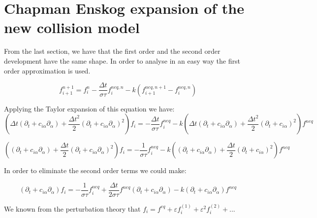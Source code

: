 \documentclass{article}
\begin{document}
\section{Chapman Enskog expansion of the new collision model}
From the last section, we have that the first order and the second order development have the same shape. In order to analyse in an easy way the first order approximation is
used.

\begin{equation}
    f_{i+1}^{n+1} =f_{i}^{n} -\frac{\Delta t}{\sigma\tau } f_{i}^{neq,n} -k\left( f_{i+1}^{neq,n+1} -f_{i}^{neq,n}\right)
\end{equation}

Applying the Taylor expansion of this equation we have:
\begin{equation}
    \left( \Delta t( \partial _{t} +c_{i\alpha } \partial _{\alpha }) +\frac{\Delta t^{2}}{2}( \partial _{t} +c_{i\alpha } \partial _{\alpha })^{2}\right) f_{i} = -\frac{\Delta t}{\sigma\tau } f_{i}^{neq} -k\left( \Delta t( \partial _{t} +c_{i\alpha } \partial _{\alpha }) +\frac{\Delta t^{2}}{2}( \partial _{t} +c_{i\alpha })^{2}\right) f^{neq}
\end{equation}

\begin{equation*}
    \left(( \partial _{t} +c_{i\alpha } \partial _{\alpha }) +\frac{\Delta t}{2}( \partial _{t} +c_{i\alpha } \partial _{\alpha })^{2}\right) f_{i} = -\frac{1}{\sigma\tau } f_{i}^{neq} -k\left(( \partial _{t} +c_{i\alpha } \partial _{\alpha }) +\frac{\Delta t}{2}( \partial _{t} +c_{i\alpha })^{2}\right) f^{neq}
\end{equation*}

In order to eliminate the second order terms we could make:

\begin{equation}
    ( \partial _{t} +c_{i\alpha } \partial _{\alpha }) f_{i} = -\frac{1}{\sigma\tau } f_{i}^{neq} +\frac{\Delta t}{2\sigma\tau } f^{neq}( \partial _{t} +c_{i\alpha } \partial _{\alpha }) -k( \partial _{t} +c_{i\alpha } \partial _{\alpha }) f^{neq}
\end{equation}

We known from the perturbation theory that $f_{i} =f^{eq} +\varepsilon f_{i}^{( 1)} +\varepsilon ^{2} f_{i}^{( 2)} +...$
\end{document}
